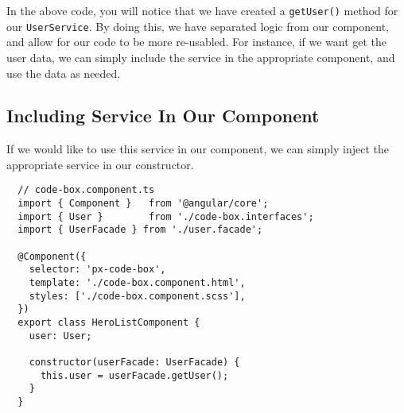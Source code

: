 In the above code, you will notice that we have created a \lstinline{getUser()}
method for our \lstinline{UserService}. By doing this, we have separated logic 
from our component, and allow for our code to be more re-usabled. For instance, 
if we want get the user data, we can simply include the service in the 
appropriate component, and use the data as needed. 

\subsection{Including Service In Our Component}
If we would like to use this service in our component, we can simply inject 
the appropriate service in our constructor. 

\begin{lstlisting}
  // code-box.component.ts
  import { Component }   from '@angular/core';
  import { User }        from './code-box.interfaces';
  import { UserFacade } from './user.facade';
  
  @Component({
    selector: 'px-code-box',
    template: './code-box.component.html',
    styles: ['./code-box.component.scss'],
  })
  export class HeroListComponent {
    user: User;
  
    constructor(userFacade: UserFacade) {
      this.user = userFacade.getUser();
    }
  }
\end{lstlisting}